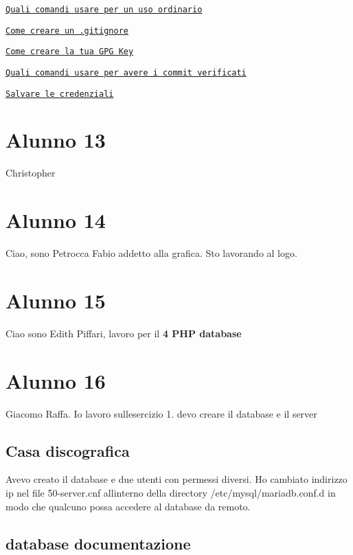 \href{https://gist.github.com/simonemastella/90364ec267d65a5328bd97c23aee1864}{\tt Quali comandi usare per un uso ordinario}

\href{https://gist.github.com/simonemastella/e69cd0a0d9fe151e52c0fc53ac4ad3ea}{\tt Come creare un .gitignore}

\href{https://gist.github.com/simonemastella/2ad4f08ed6f18af7e102a8e1a573dd8d}{\tt Come creare la tua G\+PG Key}

\href{https://gist.github.com/simonemastella/3e763531b32e1db583e2dcb4fdd668a8}{\tt Quali comandi usare per avere i commit verificati}

\href{https://gist.github.com/simonemastella/ecd089c6106a961eb9272a40c5b16d5a}{\tt Salvare le credenziali} \section*{Alunno 13}

Christopher \section*{Alunno 14}

Ciao, sono Petrocca Fabio addetto alla grafica. Sto lavorando al logo. \section*{Alunno 15}

Ciao sono Edith Piffari, lavoro per il {\bfseries 4 P\+HP database} \section*{Alunno 16}

Giacomo Raffa. Io lavoro sull\textquotesingle{}esercizio 1. devo creare il database e il server \subsection*{Casa discografica}

Avevo creato il database e due utenti con permessi diversi. Ho cambiato indirizzo ip nel file 50-\/server.\+cnf all\textquotesingle{}interno della directory /etc/mysql/mariadb.conf.\+d in modo che qualcuno possa accedere al database da remoto. \subsection*{database documentazione}

